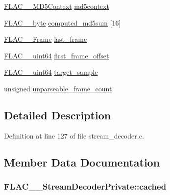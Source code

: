 \begin{DoxyCompactItemize}
\item 
\hyperlink{struct_f_l_a_c_____m_d5_context}{F\+L\+A\+C\+\_\+\+\_\+\+M\+D5\+Context} \hyperlink{struct_f_l_a_c_____stream_decoder_private_aca2ffc6b82be2383425a14f319467ee8}{md5context}
\item 
\hyperlink{ordinals_8h_a5eb569b12d5b047cdacada4d57924ee3}{F\+L\+A\+C\+\_\+\+\_\+byte} \hyperlink{struct_f_l_a_c_____stream_decoder_private_a85e13dc0a97b5eebce89fc6a1f51f547}{computed\+\_\+md5sum} \mbox{[}16\mbox{]}
\item 
\hyperlink{struct_f_l_a_c_____frame}{F\+L\+A\+C\+\_\+\+\_\+\+Frame} \hyperlink{struct_f_l_a_c_____stream_decoder_private_a1ce6041b1c69495e1a74ba38a7606099}{last\+\_\+frame}
\item 
\hyperlink{ordinals_8h_aa78c8c70a3eb8a58af7436f278acde8e}{F\+L\+A\+C\+\_\+\+\_\+uint64} \hyperlink{struct_f_l_a_c_____stream_decoder_private_aeaafb2d6b143fe7ed243ed6e8a11a859}{first\+\_\+frame\+\_\+offset}
\item 
\hyperlink{ordinals_8h_aa78c8c70a3eb8a58af7436f278acde8e}{F\+L\+A\+C\+\_\+\+\_\+uint64} \hyperlink{struct_f_l_a_c_____stream_decoder_private_a18b549424a083815a6dfa4a9333252f0}{target\+\_\+sample}
\item 
unsigned \hyperlink{struct_f_l_a_c_____stream_decoder_private_a7172ce0d384892d08810cf73852567a4}{unparseable\+\_\+frame\+\_\+count}
\end{DoxyCompactItemize}


\subsection{Detailed Description}


Definition at line 127 of file stream\+\_\+decoder.\+c.



\subsection{Member Data Documentation}
\subsubsection[{\texorpdfstring{cached}{cached}}]{ F\+L\+A\+C\+\_\+\+\_\+\+Stream\+Decoder\+Private\+::cached}\hypertarget{struct_f_l_a_c_____stream_decoder_private_a160c321d8b0ce2945dedc703bc5e7340}{}\label{struct_f_l_a_c_____stream_decoder_private_a160c321d8b0ce2945dedc703bc5e7340}



